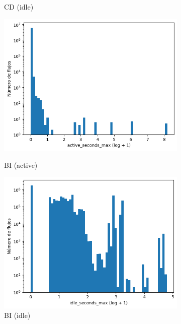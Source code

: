 \begin{figure}[H]
\begin{subfigure}[b]{0.26\textwidth}
        \caption{CD (idle)}
    \end{subfigure}
    \hfill
    \begin{subfigure}[b]{0.26\textwidth}
        \centering
        \includegraphics[width=\linewidth]{media/packet_pincer_botiot/active_seconds_max_log_x_log_y.png}
        \caption{BI (active)}
        \includegraphics[width=\linewidth]{media/packet_pincer_botiot/idle_seconds_max_log_x_log_y.png}
        \caption{BI (idle)}
    \end{subfigure}
    \hfill
    \begin{subfigure}[b]{0.26\textwidth}
        \centering

\end{subfigure}
\end{figure}
